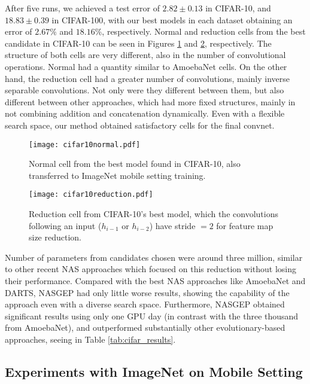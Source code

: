 \documentclass[conference]{IEEEtran}
\begin{document}
	After five runs, we achieved a test error of $2.82\pm0.13$ in CIFAR-10, and $18.83\pm0.39$ in CIFAR-100, with our best models in each dataset obtaining an error of $2.67\%$ and $18.16\%$, respectively.
	Normal and reduction cells from the best candidate in CIFAR-10 can be seen in Figures \ref{fig:cifar10_normal} and \ref{fig:cifar10_reduction}, respectively.
	The structure of both cells are very different, also in the number of convolutional operations.
	Normal had a quantity similar to AmoebaNet cells.
	On the other hand, the reduction cell had a greater number of convolutions, mainly inverse separable convolutions. 
	Not only were they different between them, but also different between other approaches, which had more fixed structures, mainly in not combining addition and concatenation dynamically.
	Even with a flexible search space, our method obtained satisfactory cells for the final convnet.
	
	
	\begin{figure}[htb]
		\centering
		\texttt{[image: cifar10normal.pdf]}
		\caption{Normal cell from the best model found in CIFAR-10, also transferred to ImageNet mobile setting training.}
		\label{fig:cifar10_normal}
	\end{figure}
	\begin{figure}[htb]
		\centering
		\texttt{[image: cifar10reduction.pdf]}	
		\caption{Reduction cell from CIFAR-10's best model, which the convolutions following an input ($h_{i-1}$ or $h_{i-2}$) have stride $=2$ for feature map size reduction.}
		\label{fig:cifar10_reduction}        
	\end{figure}
	
	Number of parameters from candidates chosen were around three million, similar to other recent NAS approaches which focused on this reduction without losing their performance.
	Compared with the best NAS approaches like AmoebaNet and DARTS, NASGEP had only little worse results, showing the capability of the approach even with a diverse search space.
	Furthermore, NASGEP obtained significant results using only one GPU day (in contrast with the three thousand from AmoebaNet), and outperformed substantially other evolutionary-based approaches, seeing in Table \ref{tab:cifar_results}.  
	
	\subsection{Experiments with ImageNet on Mobile Setting}
	
\end{document}

